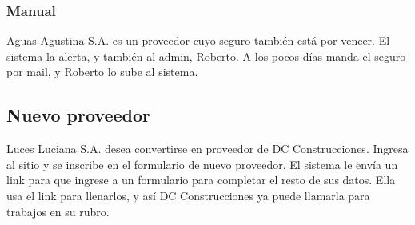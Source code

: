 \subsubsection{Manual}
Aguas Agustina S.A. es un proveedor cuyo seguro también está por vencer. El sistema la alerta, y también al admin, Roberto. A los pocos días manda el seguro por mail, y Roberto lo sube al sistema.

\subsection{Nuevo proveedor}
Luces Luciana S.A. desea convertirse en proveedor de DC Construcciones. Ingresa al sitio y se inscribe en el formulario de nuevo proveedor. El sistema le envía un link para que ingrese a un formulario para completar el resto de sus datos. Ella usa el link para llenarlos, y así DC Construcciones ya puede llamarla para trabajos en su rubro.
